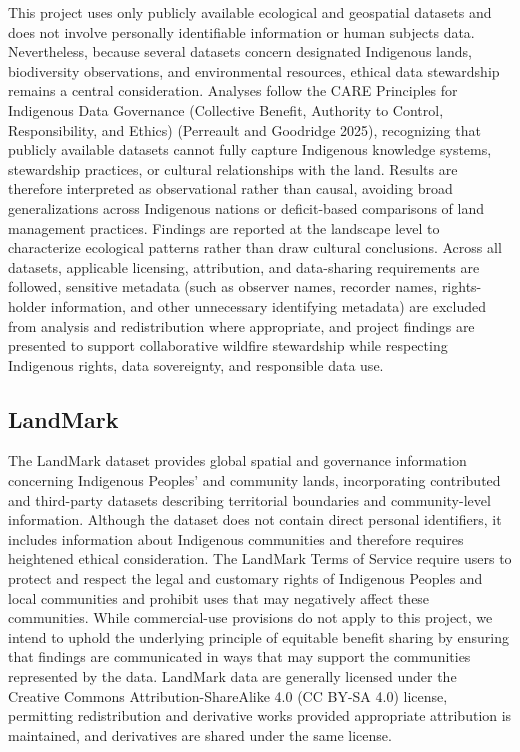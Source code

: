 \documentclass[
  letterpaper,
  DIV=11,
  numbers=noendperiod]{scrartcl}
\begin{document}
This project uses only publicly available ecological and geospatial
datasets and does not involve personally identifiable information or
human subjects data. Nevertheless, because several datasets concern
designated Indigenous lands, biodiversity observations, and
environmental resources, ethical data stewardship remains a central
consideration. \hspace{0pt} Analyses follow the CARE Principles for
Indigenous Data Governance (Collective Benefit, Authority to Control,
Responsibility, and Ethics) (Perreault and Goodridge 2025), recognizing
that publicly available datasets cannot fully capture Indigenous
knowledge systems, stewardship practices, or cultural relationships with
the land. Results are therefore interpreted as observational rather than
causal, avoiding broad generalizations across Indigenous nations or
deficit-based comparisons of land management practices. Findings are
reported at the landscape level to characterize ecological patterns
rather than draw cultural conclusions. \hspace{0pt} Across all datasets,
applicable licensing, attribution, and data-sharing requirements are
followed, sensitive metadata (such as observer names, recorder names,
rights-holder information, and other unnecessary identifying metadata)
are excluded from analysis and redistribution where appropriate, and
project findings are presented to support collaborative wildfire
stewardship while respecting Indigenous rights, data sovereignty, and
responsible data use.

\subsection{LandMark}\label{landmark}

The LandMark dataset provides global spatial and governance information
concerning Indigenous Peoples' and community lands, incorporating
contributed and third-party datasets describing territorial boundaries
and community-level information. Although the dataset does not contain
direct personal identifiers, it includes information about Indigenous
communities and therefore requires heightened ethical consideration. The
LandMark Terms of Service require users to protect and respect the legal
and customary rights of Indigenous Peoples and local communities and
prohibit uses that may negatively affect these communities. While
commercial-use provisions do not apply to this project, we intend to
uphold the underlying principle of equitable benefit sharing by ensuring
that findings are communicated in ways that may support the communities
represented by the data. LandMark data are generally licensed under the
Creative Commons Attribution-ShareAlike 4.0 (CC BY-SA 4.0) license,
permitting redistribution and derivative works provided appropriate
attribution is maintained, and derivatives are shared under the same
license.
\end{document}
